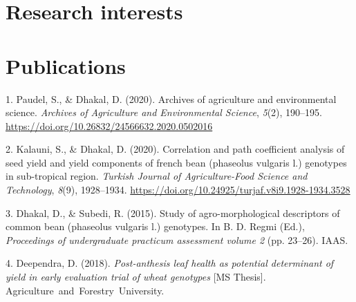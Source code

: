 \documentclass[11pt, a4paper]{awesome-cv}
\begin{document}
\hypertarget{research-interests}{%
\section{Research interests}\label{research-interests}}

\begin{cvhonors}
\end{cvhonors}

\newpage

\hypertarget{publications}{%
\section{Publications}\label{publications}}

\hypertarget{bibliography}{}
\leavevmode\hypertarget{ref-paudel2020archives}{}%
1. Paudel, S., \& Dhakal, D. (2020). Archives of agriculture and
environmental science. \emph{Archives of Agriculture and Environmental
Science}, \emph{5}(2), 190--195.
\url{https://doi.org/10.26832/24566632.2020.0502016}

\leavevmode\hypertarget{ref-kalauni2020correlation}{}%
2. Kalauni, S., \& Dhakal, D. (2020). Correlation and path coefficient
analysis of seed yield and yield components of french bean (phaseolus
vulgaris l.) genotypes in sub-tropical region. \emph{Turkish Journal of
Agriculture-Food Science and Technology}, \emph{8}(9), 1928--1934.
\url{https://doi.org/10.24925/turjaf.v8i9.1928-1934.3528}

\leavevmode\hypertarget{ref-ddhakal-agro-morpho2015:iaasproceeding-lamjung}{}%
3. Dhakal, D., \& Subedi, R. (2015). Study of agro-morphological
descriptors of common bean (phaseolus vulgaris l.) genotypes. In B. D.
Regmi (Ed.), \emph{Proceedings of undergraduate practicum assessment
volume 2} (pp. 23--26). IAAS.

\leavevmode\hypertarget{ref-ddhakal2018postanthesis}{}%
4. Deependra, D. (2018). \emph{Post-anthesis leaf health as potential
determinant of yield in early evaluation trial of wheat genotypes} {[}MS
Thesis{]}. Agriculture~and~Forestry~University.
\end{document}

